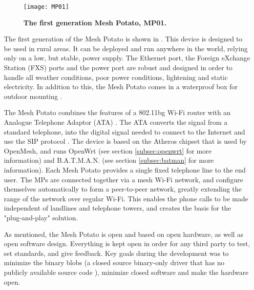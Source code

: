 \begin{figure}[b]
  \centering
      \texttt{[image: MP01]}
  \caption [MP01]{\textbf{The first generation Mesh Potato, MP01.}}
  \label{fig:MP01}
\end{figure}

The first generation of the Mesh Potato is shown in . This device is designed to be used in rural areas. It can be deployed and run anywhere in the world, relying only on a low, but stable, power supply. The Ethernet port, the Foreign eXchange Station (FXS) ports and the power port are robust and designed in order to handle all weather conditions, poor power conditions, lightening and static electricity. In addition to this, the Mesh Potato comes in a waterproof box for outdoor mounting \cite{background}.

The Mesh Potato combines the features of a 802.11bg Wi-Fi router with an Analogue Telephone Adaptor (ATA) \cite{MP}. The ATA converts the signal from a standard telephone, into the digital signal needed to connect to the Internet and use the SIP protocol \cite{MParticle}. The device is based on the Atheros chipset that is used by OpenMesh, and runs OpenWrt (see section \ref{subsec:openwrt} for more information) and B.A.T.M.A.N. (see section \ref{subsec:batman} for more information). Each Mesh Potato provides a single fixed telephone line to the end user. The MPs are connected together via a mesh Wi-Fi network, and configure themselves automatically to form a peer-to-peer network, greatly extending the range of the network over regular Wi-Fi. This enables the phone calls to be made independent of landlines and telephone towers, and creates the basis for the "plug-and-play" solution. 

As mentioned, the Mesh Potato is open and based on open hardware, as well as open software design. Everything is kept open in order for any third party to test, set standards, and give feedback. Key goals during the development was to minimize the binary blobs (a closed source binary-only driver that has no publicly available source code \cite{binaryBolb}), minimize closed software and make the hardware open. 

